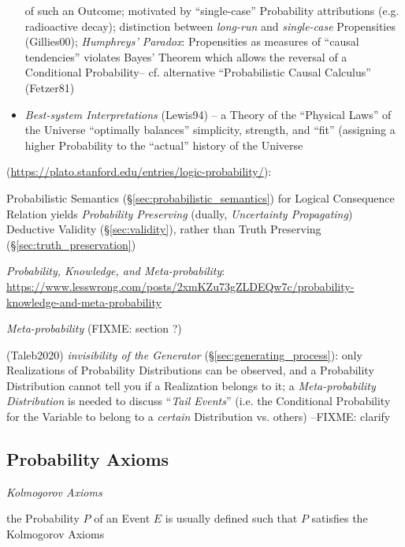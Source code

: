 \begin{itemize}
    of such an Outcome; motivated by ``single-case'' Probability attributions
    (e.g. radioactive decay); distinction between \emph{long-run} and
    \emph{single-case} Propensities (Gillies00); \emph{Humphreys' Paradox}:
    Propensities as measures of ``causal tendencies'' violates Bayes' Theorem
    which allows the reversal of a Conditional Probability-- cf. alternative
    ``Probabilistic Causal Calculus'' (Fetzer81)
  \item \emph{Best-system Interpretations} (Lewis94) -- a Theory of the
    ``Physical Laws'' of the Universe ``optimally balances'' simplicity,
    strength, and ``fit'' (assigning a higher Probability to the ``actual''
    history of the Universe
\end{itemize}

(\url{https://plato.stanford.edu/entries/logic-probability/}):

Probabilistic Semantics (\S\ref{sec:probabilistic_semantics}) for Logical
Consequence Relation yields \emph{Probability Preserving} (dually,
\emph{Uncertainty Propagating}) Deductive Validity (\S\ref{sec:validity}),
rather than Truth Preserving (\S\ref{sec:truth_preservation})

\emph{Probability, Knowledge, and Meta-probability}:
\url{https://www.lesswrong.com/posts/2xmKZu73gZLDEQw7c/probability-knowledge-and-meta-probability}

\asterism

\emph{Meta-probability} (FIXME: section ?)

(Taleb2020) \emph{invisibility of the Generator}
(\S\ref{sec:generating_process}): only Realizations of Probability Distributions
can be observed, and a Probability Distribution cannot tell you if a Realization
belongs to it; a \emph{Meta-probability Distribution} is needed to discuss
``\emph{Tail Events}'' (i.e. the Conditional Probability for the Variable to
belong to a \emph{certain} Distribution vs. others) --FIXME: clarify



\subsection{Probability Axioms}\label{sec:probability_axioms}

\emph{Kolmogorov Axioms}

the Probability $P$ of an Event $E$ is usually defined such that $P$ satisfies
the Kolmogorov Axioms

